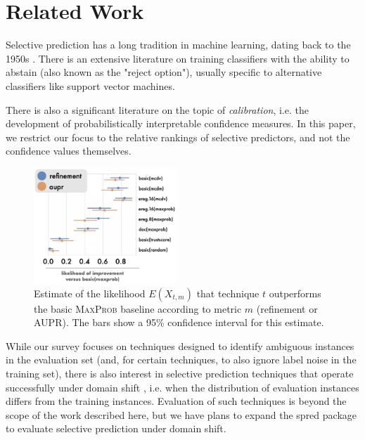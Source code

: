 \documentclass[11pt]{article}
\begin{document}
\section{Related Work}

Selective prediction has a long tradition in machine learning, dating back to the  1950s \cite{chow1957optimum}. There is an extensive literature \cite{hellman1970nearest,fumera2002support,cortes2016learning} on training classifiers with the ability to abstain (also known as the "reject option"), usually specific to alternative classifiers like support vector machines.

There is also a significant literature \cite{platt1999probabilistic,guo2017calibration,kumar2018trainable,wang-etal-2020-inference,desai-durrett-2020-calibration} on the topic of \emph{calibration}, i.e. the development of probabilistically interpretable confidence measures. In this paper, we restrict our focus to the relative rankings of selective predictors, and not the confidence values themselves. 

\begin{figure}[tb]
\centering
\includegraphics[width=0.48\textwidth]{pointplot2.png}
\caption{Estimate of the likelihood $E(X_{t,m})$ that technique $t$ outperforms the basic \textsc{MaxProb} baseline according to metric $m$ (refinement or \textsc{AUPR}). The bars show a 95\% confidence interval for this estimate.}\label{fig:auprpointplot}
\end{figure}

While our survey focuses on techniques designed to identify ambiguous instances in the evaluation set (and, for certain techniques, to also ignore label noise in the training set), there is also interest in selective prediction techniques that operate successfully under domain shift \cite{kamath-etal-2020-selective,liu2020energy}, i.e. when the distribution of evaluation instances differs from the training instances. Evaluation of such techniques is beyond the scope of the work described here, but we have plans to expand the \textsf{spred} package to evaluate selective prediction under domain shift.
\end{document}
